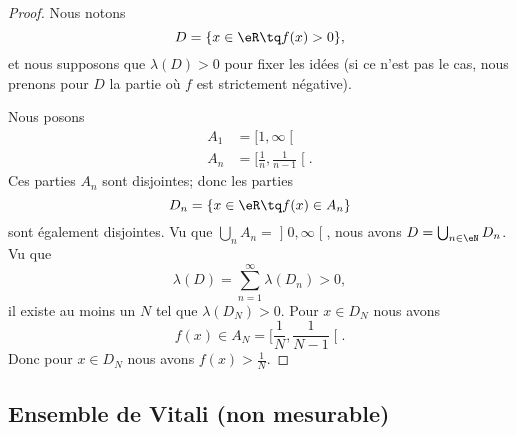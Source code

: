 \begin{proof}
	Nous notons
	\begin{equation}
		D=\{ x\in \eR\tq f(x)>0 \},
	\end{equation}
	et nous supposons que \( \lambda(D)>0\) pour fixer les idées (si ce n'est pas le cas, nous prenons pour \( D\) la partie où \( f\) est strictement négative).

	Nous posons
	\begin{subequations}
		\begin{align}
			A_1 & =\mathopen[ 1 , \infty \mathclose[                       \\
			A_n & =\mathopen[ \frac{1}{ n } , \frac{1}{ n-1 } \mathclose[.
		\end{align}
	\end{subequations}
	Ces parties \( A_n\) sont disjointes; donc les parties
	\begin{equation}
		D_n=\{ x\in \eR\tq f(x)\in A_n \}
	\end{equation}
	sont également disjointes. Vu que \( \bigcup_nA_n=\mathopen] 0 , \infty \mathclose[\), nous avons \( D=\bigcup_{n\in \eN}D_n\). Vu que
	\begin{equation}
		\lambda(D)=\sum_{n=1}^{\infty}\lambda(D_n)>0,
	\end{equation}
	il existe au moins un \( N\) tel que \( \lambda(D_N)>0\). Pour \( x\in D_N\) nous avons
	\begin{equation}
		f(x)\in A_N=\mathopen[ \frac{1}{ N } , \frac{1}{ N-1 } \mathclose[.
	\end{equation}
	Donc pour \( x\in D_N\) nous avons \( f(x)>\frac{1}{ N }\).
\end{proof}

\subsection{Ensemble de Vitali (non mesurable)}

